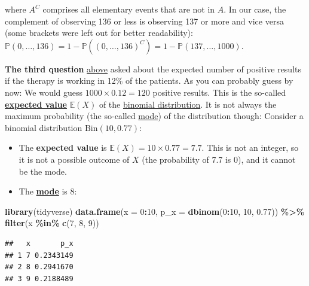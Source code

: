 \documentclass[
]{book}
\newenvironment{Shaded}{\begin{snugshade}}{\end{snugshade}}
\newcommand{\AttributeTok}[1]{\textcolor[rgb]{0.13,0.29,0.53}{#1}}
\newcommand{\DecValTok}[1]{\textcolor[rgb]{0.00,0.00,0.81}{#1}}
\newcommand{\FloatTok}[1]{\textcolor[rgb]{0.00,0.00,0.81}{#1}}
\newcommand{\FunctionTok}[1]{\textcolor[rgb]{0.13,0.29,0.53}{\textbf{#1}}}
\newcommand{\NormalTok}[1]{#1}
\newcommand{\SpecialCharTok}[1]{\textcolor[rgb]{0.81,0.36,0.00}{\textbf{#1}}}
\providecommand{\tightlist}{%
  \setlength{\itemsep}{0pt}\setlength{\parskip}{0pt}}
\begin{document}
where \(A^C\) comprises all elementary events that are not in \(A\). In our case, the complement of observing 136 or
less is observing 137 or more and vice versa (some brackets were left out for better readability):
\(\mathbb{P}(0, \dots, 136) = 1 - \mathbb{P}((0, \dots, 136)^C) = 1 - \mathbb{P}(137, \dots, 1000)\).

\textbf{The third question} \hyperref[Questions_about_the_1000-researcher_experiment]{above}
asked about the expected number of positive results if the therapy is working in 12\% of the patients.
As you can probably guess by now: We would guess \(1000 \times 0.12 = 120\) positive results.
This is the so-called \textbf{\href{https://en.wikipedia.org/wiki/Expected_value}{expected value}} \(\mathbb{E}(X)\) of the \href{https://en.wikipedia.org/wiki/Binomial_distribution}{binomial distribution}.
It is not always the maximum probability (the so-called \href{https://en.wikipedia.org/wiki/Mode_(statistics)}{mode}) of the distribution though:
Consider a binomial distribution \(\text{Bin}(10, 0.77)\):

\begin{itemize}
\tightlist
\item
  The \textbf{expected value} is \(\mathbb{E}(X) = 10 \times 0.77 = 7.7\). This is not an integer, so it is not a possible outcome of \(X\) (the probability of 7.7 is 0), and it cannot be the mode.
\item
  The \textbf{\href{https://en.wikipedia.org/wiki/Mode_(statistics)}{mode}} is 8:
\end{itemize}

\begin{Shaded}
\begin{Highlighting}[]
\FunctionTok{library}\NormalTok{(tidyverse)}
\FunctionTok{data.frame}\NormalTok{(}\AttributeTok{x =} \DecValTok{0}\SpecialCharTok{:}\DecValTok{10}\NormalTok{,}
           \AttributeTok{p\_x =} \FunctionTok{dbinom}\NormalTok{(}\DecValTok{0}\SpecialCharTok{:}\DecValTok{10}\NormalTok{, }\DecValTok{10}\NormalTok{, }\FloatTok{0.77}\NormalTok{)) }\SpecialCharTok{\%\textgreater{}\%}
  \FunctionTok{filter}\NormalTok{(x }\SpecialCharTok{\%in\%} \FunctionTok{c}\NormalTok{(}\DecValTok{7}\NormalTok{, }\DecValTok{8}\NormalTok{, }\DecValTok{9}\NormalTok{))}
\end{Highlighting}
\end{Shaded}

\begin{verbatim}
##   x       p_x
## 1 7 0.2343149
## 2 8 0.2941670
## 3 9 0.2188489
\end{verbatim}
\end{document}
